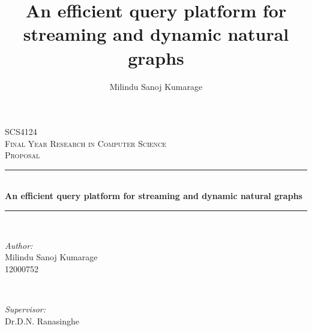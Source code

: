 \documentclass[12pt]{article}
\title{An efficient query platform for streaming and dynamic natural graphs}
\author{Milindu Sanoj Kumarage}
\begin{document}
\begin{titlepage}

\newcommand{\HRule}{\rule{\linewidth}{0.5mm}} %

\center %
 

\textsc{\Large SCS4124}\\[0.5cm] 
\textsc{\large Final Year Research in Computer Science}\\[1.5cm]
\textsc{\LARGE Proposal}\\[0.5cm] 

\HRule \\[0.4cm]
{ \LARGE \bfseries An efficient query platform for streaming and dynamic natural graphs }\\[0.4cm]
\HRule \\[1.5cm]
 

\begin{minipage}{0.4\textwidth}
\begin{flushleft} \large
\emph{Author:}\\
Milindu Sanoj Kumarage\\
12000752\\
\end{flushleft}
\end{minipage}
~
\begin{minipage}{0.4\textwidth}
\begin{flushright} \large
\emph{Supervisor:} \\
Dr.D.N. Ranasinghe
\end{flushright}
\end{minipage}\\[4cm]



\end{titlepage}
\end{document}
